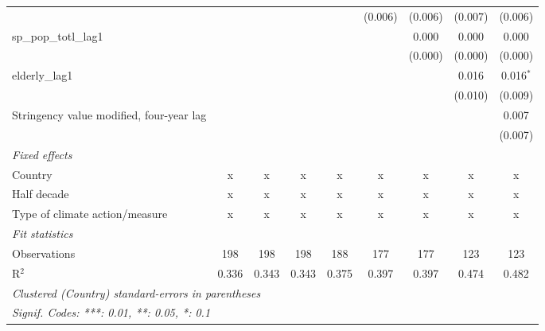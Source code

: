 \begin{tabular}{lcccccccc}
                                                           &                &                &                &               & (0.006) & (0.006) & (0.007)      & (0.006)\\   
   sp\_pop\_totl\_lag1                                     &                &                &                &               &         & 0.000   & 0.000        & 0.000\\   
                                                           &                &                &                &               &         & (0.000) & (0.000)      & (0.000)\\   
   elderly\_lag1                                           &                &                &                &               &         &         & 0.016        & 0.016$^{*}$\\   
                                                           &                &                &                &               &         &         & (0.010)      & (0.009)\\   
   Stringency value modified, four-year lag                &                &                &                &               &         &         &              & 0.007\\   
                                                           &                &                &                &               &         &         &              & (0.007)\\   
   \emph{Fixed effects}\\
   Country                                                 & x              & x              & x              & x             & x       & x       & x            & x\\  
   Half decade                                             & x              & x              & x              & x             & x       & x       & x            & x\\  
   Type of climate action/measure                          & x              & x              & x              & x             & x       & x       & x            & x\\  
   \midrule \emph{Fit statistics}\\
   Observations                                            & 198            & 198            & 198            & 188           & 177     & 177     & 123          & 123\\  
   R$^2$                                                   & 0.336          & 0.343          & 0.343          & 0.375         & 0.397   & 0.397   & 0.474        & 0.482\\  
   \midrule
   \multicolumn{9}{l}{\emph{Clustered (Country) standard-errors in parentheses}}\\
   \multicolumn{9}{l}{\emph{Signif. Codes: ***: 0.01, **: 0.05, *: 0.1}}\\
\end{tabular}
\par\endgroup


